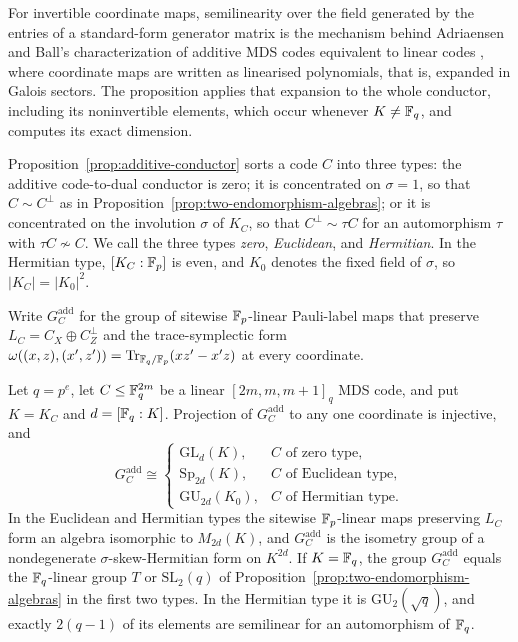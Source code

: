 For invertible coordinate maps, semilinearity over the field generated by
the entries of a standard-form generator matrix is the mechanism behind
Adriaensen and Ball's characterization of additive MDS codes equivalent to
linear codes \cite[Lemmas~5.2 and~5.6]{AdriaensenBall2023}, where coordinate
maps are written as linearised polynomials, that is, expanded in Galois
sectors.  The proposition applies that expansion to the whole conductor,
including its noninvertible elements, which occur whenever \(K\ne\mathbb F_q\), and
computes its exact dimension.

Proposition~\ref{prop:additive-conductor} sorts a code \(C\) into three
types: the additive code-to-dual conductor is zero; it is concentrated on
\(\sigma=1\), so that \(C\sim C^\perp\) as in
Proposition~\ref{prop:two-endomorphism-algebras}; or it is concentrated on
the involution \(\sigma\) of \(K_C\), so that \(C^\perp\sim\tau C\) for an
automorphism \(\tau\) with \(\tau C\not\sim C\).  We call the three types
\emph{zero}, \emph{Euclidean}, and \emph{Hermitian}.  In the Hermitian type,
\([K_C:\mathbb F_p]\) is even, and \(K_0\) denotes the fixed field of \(\sigma\),
so \(|K_C|=|K_0|^2\).

Write \(G^{\mathrm{add}}_C\) for the group of sitewise \(\mathbb F_p\)-linear
Pauli-label maps that preserve \(L_C=C_X\oplus C^\perp_Z\) and the
trace-symplectic form
\(\omega((x,z),(x',z'))=\operatorname{Tr}_{\mathbb F_q/\mathbb F_p}(xz'-x'z)\) at every coordinate.

\begin{theorem}
\label{thm:additive-label-groups}
Let \(q=p^e\), let \(C\leq\mathbb F_q^{2m}\) be a linear \([2m,m,m+1]_q\) MDS code,
and put \(K=K_C\) and \(d=[\mathbb F_q:K]\).  Projection of
\(G^{\mathrm{add}}_C\) to any one coordinate is injective, and
\[
 G^{\mathrm{add}}_C\cong
 \begin{cases}
  \mathrm{GL}_d(K), & C\text{ of zero type},\\
  \mathrm{Sp}_{2d}(K), & C\text{ of Euclidean type},\\
  \mathrm{GU}_{2d}(K_0), & C\text{ of Hermitian type}.
 \end{cases}
\]
In the Euclidean and Hermitian types the sitewise \(\mathbb F_p\)-linear maps
preserving \(L_C\) form an algebra isomorphic to \(M_{2d}(K)\), and
\(G^{\mathrm{add}}_C\) is the isometry group of a nondegenerate
\(\sigma\)-skew-Hermitian form on \(K^{2d}\).  If \(K=\mathbb F_q\), the group
\(G^{\mathrm{add}}_C\) equals the \(\mathbb F_q\)-linear group \(T\) or
\(\mathrm{SL}_2(q)\) of Proposition~\ref{prop:two-endomorphism-algebras} in
the first two types.  In the Hermitian type it is
\(\mathrm{GU}_2(\sqrt q)\), and exactly \(2(q-1)\) of its elements are
semilinear for an automorphism of \(\mathbb F_q\).
\end{theorem}

